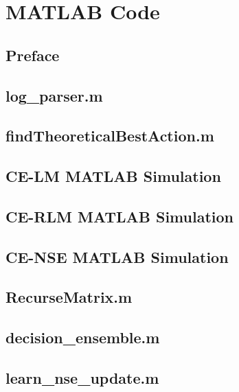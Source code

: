 
\chapter{MATLAB Code}\label{app:MatlabCode}
\section{Preface}
\section{log\_parser.m}\label{app:MatlabCode:parser}

\clearpage
\section{findTheoreticalBestAction.m}\label{app:MatlabCode:optimalCalc}

\clearpage
\section{CE-LM MATLAB Simulation}

\clearpage
\section{CE-RLM MATLAB Simulation}

\clearpage
\section{CE-NSE MATLAB Simulation}

\clearpage
\section{RecurseMatrix.m}\label{app:MatlabCode:recurseMatrix}

\clearpage
\section{decision\_ensemble.m}\label{app:MatlabCode:decisionEnsemble}

\clearpage
\section{learn\_nse\_update.m}\label{app:MatlabCode:learnNSEUpdate}

\clearpage
